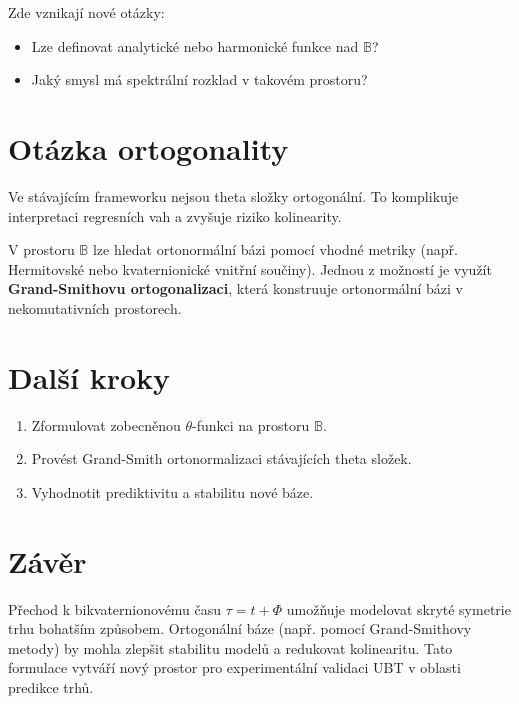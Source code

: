 \documentclass[12pt]{article}
\begin{document}
Zde vznikají nové otázky:
\begin{itemize}
    \item Lze definovat analytické nebo harmonické funkce nad $\mathbb{B}$?
    \item Jaký smysl má spektrální rozklad v takovém prostoru?
\end{itemize}

\section{Otázka ortogonality}
Ve stávajícím frameworku nejsou theta složky ortogonální. To komplikuje interpretaci regresních vah a zvyšuje riziko kolinearity.

V prostoru $\mathbb{B}$ lze hledat ortonormální bázi pomocí vhodné metriky (např. Hermitovské nebo kvaternionické vnitřní součiny). Jednou z možností je využít \textbf{Grand-Smithovu ortogonalizaci}, která konstruuje ortonormální bázi v nekomutativních prostorech.

\section{Další kroky}
\begin{enumerate}
    \item Zformulovat zobecněnou $\theta$-funkci na prostoru $\mathbb{B}$.
    \item Provést Grand-Smith ortonormalizaci stávajících theta složek.
    \item Vyhodnotit prediktivitu a stabilitu nové báze.
\end{enumerate}

\section*{Závěr}
Přechod k bikvaternionovému času $\tau = t + \Phi$ umožňuje modelovat skryté symetrie trhu bohatším způsobem. Ortogonální báze (např. pomocí Grand-Smithovy metody) by mohla zlepšit stabilitu modelů a redukovat kolinearitu. Tato formulace vytváří nový prostor pro experimentální validaci UBT v oblasti predikce trhů.
\end{document}
